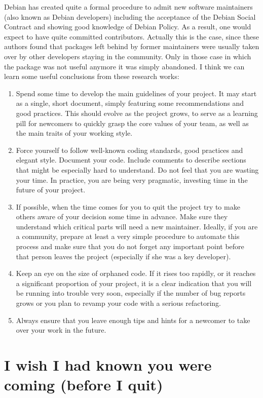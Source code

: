Debian has created quite a formal procedure to admit new software maintainers
(also known as Debian developers) including the acceptance of the Debian Social
Contract and showing good knowledge of Debian Policy. As a result, one would
expect to have quite committed contributors. Actually this is the case, since
these authors found that packages left behind by former maintainers were usually
taken over by other developers staying in the community. Only in those case in
which the package was not useful anymore it was simply abandoned.
I think we can learn some useful conclusions from these research works:
\begin{enumerate}
 \item Spend some time to develop the main guidelines of your project. It may
start as a single, short document, simply featuring some recommendations and
good practices. This should evolve as the project grows, to serve as a learning
pill for newcomers to quickly grasp the core values of your team, as well as the
main traits of your working style.
 \item Force yourself to follow well-known coding standards, good practices and
elegant style. Document your code. Include comments to describe sections that
might be especially hard to understand. Do not feel that you are wasting your
time. In practice, you are being very pragmatic, investing time in the future of
your project.
 \item If possible, when the time comes for you to quit the project try to make
others aware of your decision some time in advance. Make sure they understand
which critical parts will need a new maintainer. Ideally, if you are a
community, prepare at least a very simple procedure to automate this process and
make sure that you do not forget any important point before that person leaves
the project (especially if she was a key developer).
 \item Keep an eye on the size of orphaned code. If it rises too rapidly, or it
reaches a significant proportion of your project, it is a clear indication that
you will be running into trouble very soon, especially if the number of bug
reports grows or you plan to revamp your code with a serious refactoring.
 \item Always ensure that you leave enough tips and hints for a newcomer to take
over your work in the future.
\end{enumerate}

\section*{I wish I had known you were coming (before I quit)}

